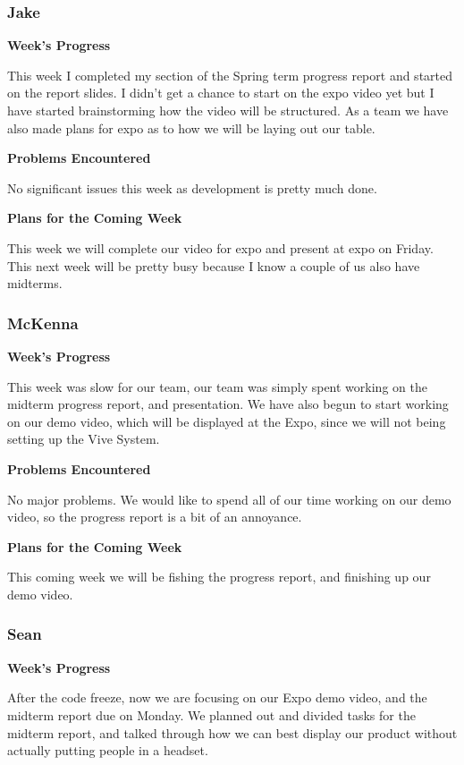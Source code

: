 \documentclass[10pt,journal,compsoc,onecolumn, draftclsnofoot]{IEEEtran}
\begin{document}
\subsubsection{Jake}
\noindent \textbf{Week's Progress}

This week I completed my section of the Spring term progress report and started on the report slides. I didn't get a chance to start on the expo video yet but I have started brainstorming how the video will be structured. As a team we have also made plans for expo as to how we will be laying out our table.

\noindent \textbf{Problems Encountered}

No significant issues this week as development is pretty much done.

\noindent \textbf{Plans for the Coming Week}

This week we will complete our video for expo and present at expo on Friday. This next week will be pretty busy because I know a couple of us also have midterms.

\subsubsection{McKenna}
\noindent \textbf{Week's Progress}

This week was slow for our team, our team was simply spent working on the midterm progress report, and presentation. We have also begun to start working on our demo video, which will be displayed at the Expo, since we will not being setting up the Vive System.

\noindent \textbf{Problems Encountered}

No major problems. We would like to spend all of our time working on our demo video, so the progress report is a bit of an annoyance.

\noindent \textbf{Plans for the Coming Week}

This coming week we will be fishing the progress report, and finishing up our demo video.

\subsubsection{Sean}
\noindent \textbf{Week's Progress}

After the code freeze, now we are focusing on our Expo demo video, and the midterm report due on Monday. We planned out and divided tasks for the midterm report, and talked through how we can best display our product without actually putting people in a headset.
\end{document}
